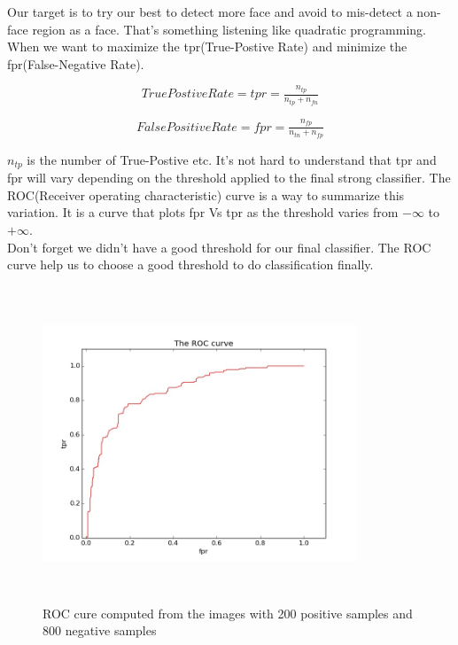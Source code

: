 \documentclass[a4paper, 11pt]{article} %
\begin{document}
    Our target is to try our best to detect more face and avoid to mis-detect a non-face region as a face. That's something listening like quadratic programming. When we want to maximize the tpr(True-Postive Rate) and minimize the fpr(False-Negative Rate).

    \begin{equation}
        TruePostive Rate = tpr = \tfrac{n_{tp}}{n_{tp} + n_{fn}}
    \end{equation}

    \begin{equation}
        FalsePositive Rate = fpr = \tfrac{n_{fp}}{n_{tn} + n_{fp}}
    \end{equation}

    $n_{tp}$ is the number of True-Postive etc. It's not hard to understand that tpr and fpr will vary depending on the threshold applied to the final strong classifier. The ROC(Receiver operating characteristic) curve is a way to summarize this variation. It is a curve that plots fpr Vs tpr as the threshold varies from $-\infty$ to $+\infty$.\\

    Don't forget we didn't have a good threshold for our final classifier. The ROC curve help us to choose a good threshold to do classification finally.\\

    \begin{figure}[H]
        \centering
        \includegraphics[height = 3.7in, width = 3.7in ]{../figure/roc.jpg}
        \caption{ROC cure computed from the images with 200 positive samples and 800 negative samples}
        \label{fig:ROC}
    \end{figure}
\end{document}
